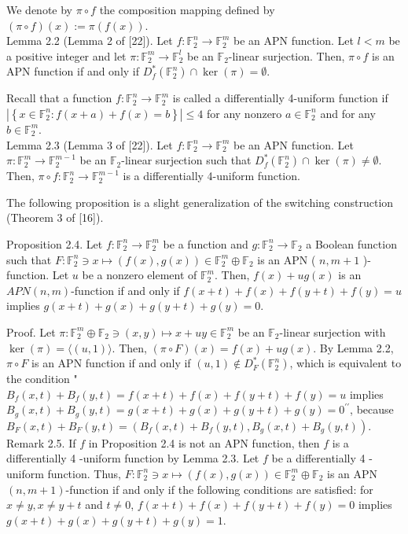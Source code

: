 \documentclass[10pt]{article}
\begin{document}
We denote by $\pi \circ f$ the composition mapping defined by $(\pi \circ f)(x):=\pi(f(x))$.\\[0pt]
Lemma 2.2 (Lemma 2 of [22]). Let $f: \mathbb{F}_{2}^{n} \rightarrow \mathbb{F}_{2}^{m}$ be an APN function. Let $l<m$ be a positive integer and let $\pi: \mathbb{F}_{2}^{m} \rightarrow \mathbb{F}_{2}^{l}$ be an $\mathbb{F}_{2}$-linear surjection. Then, $\pi \circ f$ is an APN function if and only if $D_{f}^{*}\left(\mathbb{F}_{2}^{n}\right) \cap \operatorname{ker}(\pi)=\emptyset$.

Recall that a function $f: \mathbb{F}_{2}^{n} \rightarrow \mathbb{F}_{2}^{m}$ is called a differentially 4-uniform function if $\left|\left\{x \in \mathbb{F}_{2}^{n}: f(x+a)+f(x)=b\right\}\right| \leq 4$ for any nonzero $a \in \mathbb{F}_{2}^{n}$ and for any $b \in \mathbb{F}_{2}^{m}$.\\[0pt]
Lemma 2.3 (Lemma 3 of [22]). Let $f: \mathbb{F}_{2}^{n} \rightarrow \mathbb{F}_{2}^{m}$ be an APN function. Let $\pi: \mathbb{F}_{2}^{m} \rightarrow \mathbb{F}_{2}^{m-1}$ be an $\mathbb{F}_{2}$-linear surjection such that $D_{f}^{*}\left(\mathbb{F}_{2}^{n}\right) \cap \operatorname{ker}(\pi) \neq \emptyset$. Then, $\pi \circ f: \mathbb{F}_{2}^{n} \rightarrow \mathbb{F}_{2}^{m-1}$ is a differentially 4-uniform function.

The following proposition is a slight generalization of the switching construction (Theorem 3 of [16]).

Proposition 2.4. Let $f: \mathbb{F}_{2}^{n} \rightarrow \mathbb{F}_{2}^{m}$ be a function and $g: \mathbb{F}_{2}^{n} \rightarrow \mathbb{F}_{2}$ a Boolean function such that $F: \mathbb{F}_{2}^{n} \ni x \mapsto(f(x), g(x)) \in \mathbb{F}_{2}^{m} \oplus \mathbb{F}_{2}$ is an APN ( $n, m+1$ )-function. Let $u$ be a nonzero element of $\mathbb{F}_{2}^{m}$. Then, $f(x)+u g(x)$ is an $A P N(n, m)$-function if and only if $f(x+t)+f(x)+f(y+t)+f(y)=u$ implies $g(x+t)+g(x)+g(y+t)+g(y)=0$.

Proof. Let $\pi: \mathbb{F}_{2}^{m} \oplus \mathbb{F}_{2} \ni(x, y) \mapsto x+u y \in \mathbb{F}_{2}^{m}$ be an $\mathbb{F}_{2}$-linear surjection with $\operatorname{ker}(\pi)=\langle(u, 1)\rangle$. Then, $(\pi \circ F)(x)=f(x)+u g(x)$. By Lemma 2.2, $\pi \circ F$ is an APN function if and only if $(u, 1) \notin D_{F}^{*}\left(\mathbb{F}_{2}^{n}\right)$, which is equivalent to the condition " $B_{f}(x, t)+B_{f}(y, t)=f(x+t)+f(x)+f(y+t)+f(y)=u$ implies $B_{g}(x, t)+B_{g}(y, t)= g(x+t)+g(x)+g(y+t)+g(y)=0^{\prime \prime}$, because $B_{F}(x, t)+B_{F}(y, t)=\left(B_{f}(x, t)+\right. \left.B_{f}(y, t), B_{g}(x, t)+B_{g}(y, t)\right)$.\\
Remark 2.5. If $f$ in Proposition 2.4 is not an APN function, then $f$ is a differentially 4 -uniform function by Lemma 2.3. Let $f$ be a differentially 4 -uniform function. Thus, $F: \mathbb{F}_{2}^{n} \ni x \mapsto(f(x), g(x)) \in \mathbb{F}_{2}^{m} \oplus \mathbb{F}_{2}$ is an APN $(n, m+1)$-function if and only if the following conditions are satisfied: for $x \neq y, x \neq y+t$ and $t \neq 0$, $f(x+t)+f(x)+f(y+t)+f(y)=0$ implies $g(x+t)+g(x)+g(y+t)+g(y)=1$.
\end{document}
